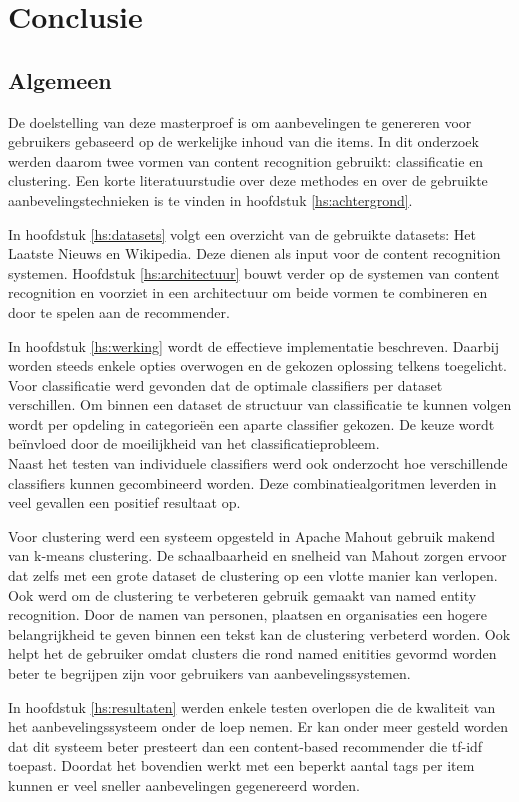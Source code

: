 \chapter{Conclusie}\label{hs:conclusie}

\section{Algemeen}

De doelstelling van deze masterproef is om aanbevelingen te genereren voor gebruikers gebaseerd op de werkelijke inhoud van die items. In dit onderzoek werden daarom twee vormen van content recognition gebruikt: classificatie en clustering. Een korte literatuurstudie over deze methodes en over de gebruikte aanbevelingstechnieken is te vinden in hoofdstuk \ref{hs:achtergrond}. 

In hoofdstuk \ref{hs:datasets} volgt een overzicht van de gebruikte datasets: Het Laatste Nieuws en Wikipedia. Deze dienen als input voor de content recognition systemen. Hoofdstuk \ref{hs:architectuur} bouwt verder op de systemen van content recognition en voorziet in een architectuur om beide vormen te combineren en door te spelen aan de recommender. 

In hoofdstuk \ref{hs:werking} wordt de effectieve implementatie beschreven. Daarbij worden steeds enkele opties overwogen en de gekozen oplossing telkens toegelicht. Voor classificatie werd gevonden dat de optimale classifiers per dataset verschillen. Om binnen een dataset de structuur van classificatie te kunnen volgen wordt per opdeling in categorie\"en een aparte classifier gekozen. De keuze wordt be\"invloed door de moeilijkheid van het classificatieprobleem. \\
Naast het testen van individuele classifiers werd ook onderzocht hoe verschillende classifiers kunnen gecombineerd worden. Deze combinatiealgoritmen leverden in veel gevallen een positief resultaat op.

Voor clustering werd een systeem opgesteld in Apache Mahout gebruik makend van k-means clustering. De schaalbaarheid en snelheid van Mahout zorgen ervoor dat zelfs met een grote dataset de clustering op een vlotte manier kan verlopen. Ook werd om de clustering te verbeteren gebruik gemaakt van named entity recognition. Door de namen van personen, plaatsen en organisaties een hogere belangrijkheid te geven binnen een tekst kan de clustering verbeterd worden. Ook helpt het de gebruiker omdat clusters die rond named enitities gevormd worden beter te begrijpen zijn voor gebruikers van aanbevelingssystemen.

In hoofdstuk \ref{hs:resultaten} werden enkele testen overlopen die de kwaliteit van het aanbevelingssysteem onder de loep nemen. Er kan onder meer gesteld worden dat dit systeem  beter presteert dan een content-based recommender die tf-idf toepast. Doordat het bovendien werkt met een beperkt aantal tags per item kunnen er veel sneller aanbevelingen gegenereerd worden. 
